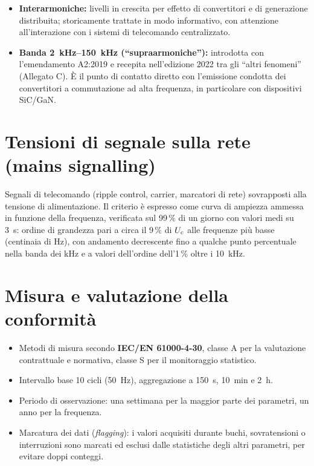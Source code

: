 \begin{itemize}[itemsep=2pt]
  \item \textbf{Interarmoniche:} livelli in crescita per effetto di convertitori e
        di generazione distribuita; storicamente trattate in modo informativo,
        con attenzione all'interazione con i sistemi di telecomando centralizzato.
  \item \textbf{Banda \SIrange{2}{150}{kHz} (``supraarmoniche''):} introdotta con
        l'emendamento A2:2019 e recepita nell'edizione 2022 tra gli
        ``altri fenomeni'' (Allegato C). È il punto di contatto diretto con
        l'emissione condotta dei convertitori a commutazione ad alta frequenza,
        in particolare con dispositivi SiC/GaN.
\end{itemize}

\section{Tensioni di segnale sulla rete (mains signalling)}

Segnali di telecomando (ripple control, carrier, marcatori di rete) sovrapposti
alla tensione di alimentazione. Il criterio è espresso come curva di ampiezza
ammessa in funzione della frequenza, verificata sul 99\,\% di un giorno con
valori medi su \SI{3}{\second}: ordine di grandezza pari a circa il 9\,\% di $U_{\mathrm{c}}$
alle frequenze più basse (centinaia di Hz), con andamento decrescente fino a
qualche punto percentuale nella banda dei kHz e a valori dell'ordine dell'1\,\%
oltre i \SI{10}{kHz}.

\section{Misura e valutazione della conformità}

\begin{itemize}[itemsep=2pt]
  \item Metodi di misura secondo \textbf{IEC/EN 61000-4-30}, classe A per la
        valutazione contrattuale e normativa, classe S per il monitoraggio statistico.
  \item Intervallo base 10 cicli (\SI{50}{Hz}), aggregazione a \SI{150}{\second},
        \SI{10}{\minute} e \SI{2}{\hour}.
  \item Periodo di osservazione: una settimana per la maggior parte dei parametri,
        un anno per la frequenza.
  \item Marcatura dei dati (\emph{flagging}): i valori acquisiti durante buchi,
        sovratensioni o interruzioni sono marcati ed esclusi dalle statistiche
        degli altri parametri, per evitare doppi conteggi.
\end{itemize}

